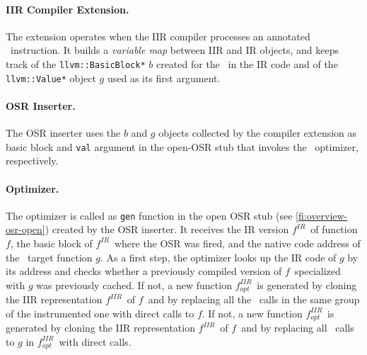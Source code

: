 \begin{enumerate}[noitemsep]
\begin{enumerate}
\paragraph{IIR Compiler Extension.}
The extension operates when the IIR compiler processes an annotated \feval\ instruction. It builds a {\em variable map} between IIR and IR objects, and keeps track of the {\tt llvm::BasicBlock*} $b$ created for the \feval\  in the IR code and of the {\tt llvm::Value*} object $g$ used as its first argument. 

\paragraph{OSR Inserter.}
The OSR inserter uses the $b$ and $g$ objects collected by the compiler extension as basic block and {\tt val} argument in the open-OSR stub that invokes the \feval\ optimizer, respectively.
\fi


\newcommand{\fBase}{$f$}
\newcommand{\fOpt}{$f_{opt}$}
\newcommand{\fIIR}{$f^{IIR}$}
\newcommand{\fIR}{$f^{IR}$}
\newcommand{\fOptIIR}{$f^{IIR}_{opt}$}
\newcommand{\fOptIR}{$f^{IR}_{opt}$}

\paragraph{Optimizer.}
The optimizer is called as {\tt gen} function in the open OSR stub (see \myfigure\ref{fi:overview-osr-open}) created by the OSR inserter. It receives the IR version \fIR\ of function $f$, the basic block of \fIR\ where the OSR was fired, and the native code address of the \feval\ target function $g$. As a first step, the optimizer looks up the IR code of $g$ by its address and checks whether a previously compiled version of \fBase\ specialized with $g$ was previously cached.
\ifdefined \fullver
If not, a new function \fOptIIR\ is generated by cloning the IIR representation \fIIR\ of \fBase\ and by replacing all the \feval\ calls in the same group of the instrumented one with direct calls to $f$.
\else
If not, a new function \fOptIIR\ is generated by cloning the IIR representation \fIIR\ of \fBase\ and by replacing all \feval\ calls to $g$ in \fOptIIR\ with direct calls.
\fi


\end{enumerate}
\end{enumerate}
